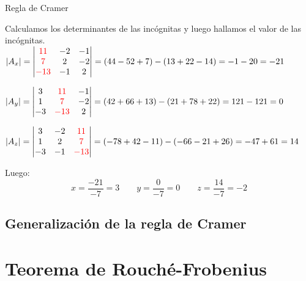 \documentclass[9pt]{beamer}
\begin{document}
\begin{frame}{Regla de Cramer}

Calculamos los determinantes de las incógnitas y luego hallamos el valor de las incógnitas.
\pause
$ |A_x|= \begin{vmatrix}
\color{red} 11 & -2 & -1 \\
\color{red} 7 & 2 & -2 \\
\color{red} -13 & -1 & 2
\end{vmatrix}= (44-52+7)-(13+22-14)=-1-20=-21 $

\pause
$ |A_y|=\begin{vmatrix}
3 & \color{red} 11 & -1 \\
1 & \color{red} 7 & -2 \\
-3 & \color{red} -13 & 2
\end{vmatrix}=(42+66+13)-(21+78+22)=121-121=0 $

\pause
$ |A_z|= \begin{vmatrix}
3 & -2 & \color{red} 11 \\
1 & 2 & \color{red} 7 \\
-3 & -1 & \color{red} -13
\end{vmatrix}=(-78+42-11)-(-66-21+26)=-47+61=14 $

\pause
Luego: 
\[ x=\dfrac{-21}{-7}=3 \qquad y=\dfrac{0}{-7}=0 \qquad z=\dfrac{14}{-7}=-2 \]
\end{frame}

\subsection{Generalización de la regla de Cramer}


\section{Teorema de Rouché-Frobenius}
\end{document}
